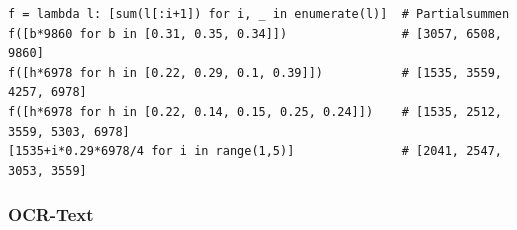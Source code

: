 \begin{lstlisting}
f = lambda l: [sum(l[:i+1]) for i, _ in enumerate(l)]  # Partialsummen
f([b*9860 for b in [0.31, 0.35, 0.34]])                # [3057, 6508, 9860]
f([h*6978 for h in [0.22, 0.29, 0.1, 0.39]])           # [1535, 3559, 4257, 6978]
f([h*6978 for h in [0.22, 0.14, 0.15, 0.25, 0.24]])    # [1535, 2512, 3559, 5303, 6978]
[1535+i*0.29*6978/4 for i in range(1,5)]               # [2041, 2547, 3053, 3559]
\end{lstlisting}





\subsubsection{OCR-Text}
\vspace*{-0.3cm}

